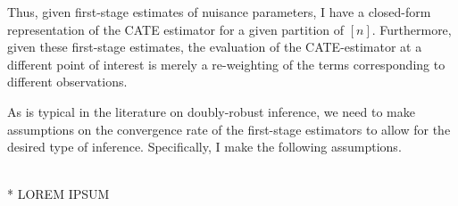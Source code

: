 Thus, given first-stage estimates of nuisance parameters, I have a closed-form representation of the CATE estimator for a given partition of $[n]$.
Furthermore, given these first-stage estimates, the evaluation of the CATE-estimator at a different point of interest is merely a re-weighting of the terms corresponding to different observations.

As is typical in the literature on doubly-robust inference, we need to make assumptions on the convergence rate of the first-stage estimators to allow for the desired type of inference.
Specifically, I make the following assumptions.
\begin{boxD}
    \begin{asm}\label{asm:DDML_Rate_Cond}\mbox{}\\*
        {\color{red} LOREM IPSUM}
    \end{asm}    
\end{boxD}

